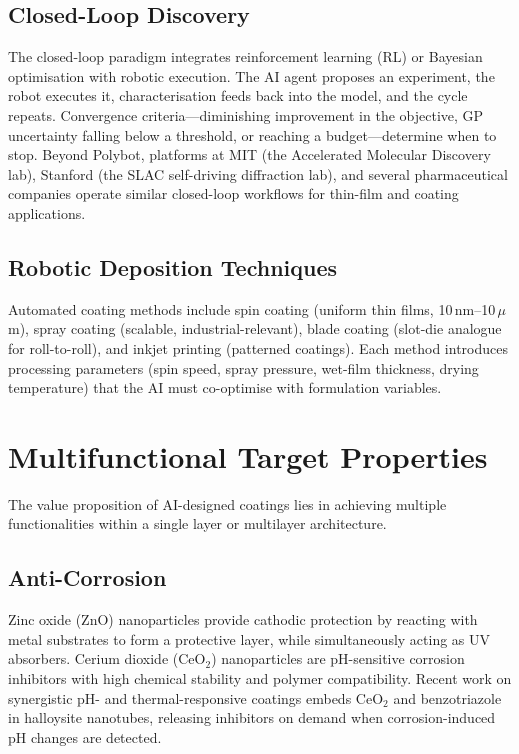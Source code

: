 \documentclass[11pt,a4paper]{article}
\begin{document}
\subsection{Closed-Loop Discovery}

The closed-loop paradigm integrates reinforcement learning (RL) or Bayesian optimisation with robotic execution.
The AI agent proposes an experiment, the robot executes it, characterisation feeds back into the model, and the cycle repeats.
Convergence criteria---diminishing improvement in the objective, GP uncertainty falling below a threshold, or reaching a budget---determine when to stop.
Beyond Polybot, platforms at MIT (the Accelerated Molecular Discovery lab), Stanford (the SLAC self-driving diffraction lab), and several pharmaceutical companies operate similar closed-loop workflows for thin-film and coating applications.

\subsection{Robotic Deposition Techniques}

Automated coating methods include spin coating (uniform thin films, 10\,nm--10\,$\mu$m), spray coating (scalable, industrial-relevant), blade coating (slot-die analogue for roll-to-roll), and inkjet printing (patterned coatings).
Each method introduces processing parameters (spin speed, spray pressure, wet-film thickness, drying temperature) that the AI must co-optimise with formulation variables.

\section{Multifunctional Target Properties}
\label{sec:multifunc}

The value proposition of AI-designed coatings lies in achieving multiple functionalities within a single layer or multilayer architecture.

\subsection{Anti-Corrosion}

Zinc oxide (ZnO) nanoparticles provide cathodic protection by reacting with metal substrates to form a protective layer, while simultaneously acting as UV absorbers.
Cerium dioxide (CeO$_2$) nanoparticles are pH-sensitive corrosion inhibitors with high chemical stability and polymer compatibility.
Recent work on synergistic pH- and thermal-responsive coatings embeds CeO$_2$ and benzotriazole in halloysite nanotubes, releasing inhibitors on demand when corrosion-induced pH changes are detected.
\end{document}
